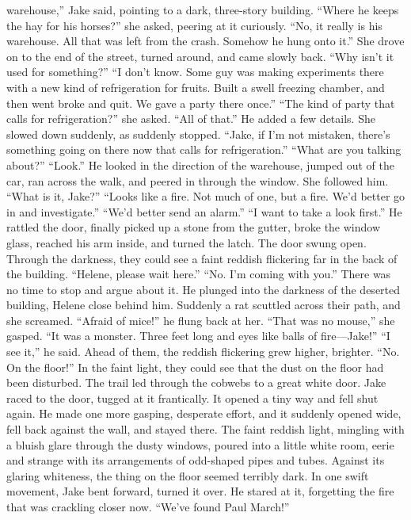 \documentclass{novel}
\begin{document}
warehouse,” Jake said, pointing to a dark, three-story building. “Where he keeps the hay for his horses?” she asked, peering at it curiously. “No, it really is his warehouse. All that was left from the crash. Somehow he hung onto it.” She drove on to the end of the street, turned around, and came slowly back. “Why isn’t it used for something?” “I don’t know. Some guy was making experiments there with a new kind of refrigeration for fruits. Built a swell freezing chamber, and then went broke and quit. We gave a party there once.” “The kind of party that calls for refrigeration?” she asked. “All of that.” He added a few details. She slowed down suddenly, as suddenly stopped. “Jake, if I’m not mistaken, there’s something going on there now that calls for refrigeration.” “What are you talking about?” “Look.” He looked in the direction of the warehouse, jumped out of the car, ran across the walk, and peered in through the window. She followed him. “What is it, Jake?” “Looks like a fire. Not much of one, but a fire. We’d better go in and investigate.” “We’d better send an alarm.” “I want to take a look first.” He rattled the door, finally picked up a stone from the gutter, broke the window glass, reached his arm inside, and turned the latch. The door swung open. Through the darkness, they could see a faint reddish flickering far in the back of the building. “Helene, please wait here.” “No. I’m coming with you.” There was no time to stop and argue about it. He plunged into the darkness of the deserted building, Helene close behind him. Suddenly a rat scuttled across their path, and she screamed. “Afraid of mice!” he flung back at her. “That was no mouse,” she gasped. “It was a monster. Three feet long and eyes like balls of fire—Jake!” “I see it,” he said. Ahead of them, the reddish flickering grew higher, brighter. “No. On the floor!” In the faint light, they could see that the dust on the floor had been disturbed. The trail led through the cobwebs to a great white door. Jake raced to the door, tugged at it frantically. It opened a tiny way and fell shut again. He made one more gasping, desperate effort, and it suddenly opened wide, fell back against the wall, and stayed there. The faint reddish light, mingling with a bluish glare through the dusty windows, poured into a little white room, eerie and strange with its arrangements of odd-shaped pipes and tubes. Against its glaring whiteness, the thing on the floor seemed terribly dark. In one swift movement, Jake bent forward, turned it over. He stared at it, forgetting the fire that was crackling closer now. “We’ve found Paul March!”
\end{document}
